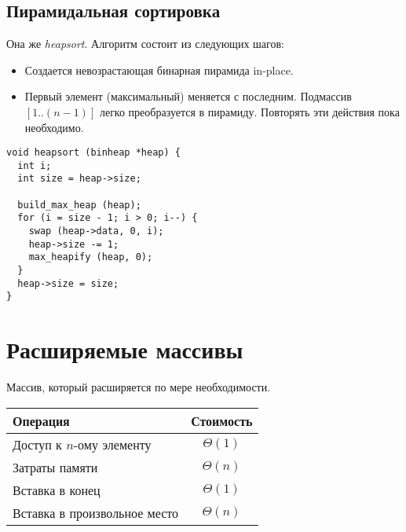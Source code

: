 \subsection{Пирамидальная сортировка}

Она же \emph{heapsort}. Алгоритм состоит из следующих шагов:
\begin{itemize}
  \item Создается невозрастающая бинарная пирамида in-place.
  \item Первый элемент (максимальный) меняется с последним. Подмассив $[1..(n - 1)]$ легко преобразуется в пирамиду. Повторять эти действия пока необходимо.
\end{itemize}

\lstset{label=lst:heapsort,caption=Реализация}
\begin{lstlisting}
void heapsort (binheap *heap) {
  int i;
  int size = heap->size;

  build_max_heap (heap);
  for (i = size - 1; i > 0; i--) {
    swap (heap->data, 0, i);
    heap->size -= 1;
    max_heapify (heap, 0);
  }
  heap->size = size;
}
\end{lstlisting}

\section{Расширяемые массивы}
\label{sec:ext-arrays}

Массив, который расширяется по мере необходимости.
\begin{center}
  \begin{tabular}{lc}
    \toprule
    Операция & Стоимость \\
    \midrule
    Доступ к $n$-ому элементу & $\Theta(1)$ \\
    Затраты памяти & $\Theta(n)$ \\
    Вставка в конец & $\Theta(1)$ \\
    Вставка в произвольное место & $\Theta(n)$ \\
    \bottomrule
  \end{tabular}
\end{center}


